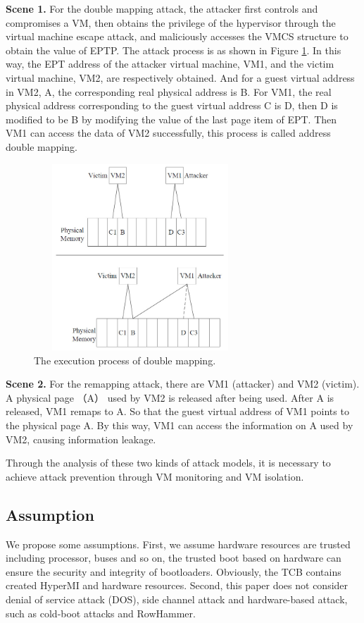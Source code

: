 \documentclass[conference]{IEEEtran}
\begin{document}
\textbf{Scene 1.} 
    For the double mapping attack, the attacker first controls and compromises a VM, then obtains the privilege of the hypervisor through the virtual machine escape attack, and maliciously accesses the VMCS structure to obtain the value of EPTP. The attack process is as shown in Figure \ref{fig0}. In this way, the EPT address of the attacker virtual machine, VM1, and the victim virtual machine, VM2, are respectively obtained. And for a guest virtual address in VM2, A, the corresponding real physical address is B. For VM1, the real physical address corresponding to the guest virtual address C is D, then D is modified to be B by modifying the value of the last page item of EPT. Then VM1 can access the data of VM2 successfully, this process is called address double mapping.

\begin{figure}
\centerline{\includegraphics[width=8cm, height=7cm]{VMCS0.jpg}}%
\caption{The execution process of double mapping. } \label{fig0}
\end{figure}

\textbf{Scene 2.}
    For the remapping attack, there are VM1 (attacker) and VM2 (victim). A physical page （A） used by VM2 is released after being used. After A is released, VM1 remaps to A. So that the guest virtual address of VM1 points to the physical page A. By this way, VM1 can access the information on A used by VM2, causing information leakage.

Through the analysis of these two kinds of attack models, it is necessary to achieve attack prevention through VM monitoring and VM isolation.
\subsection{Assumption}

We propose some assumptions.
First, we assume hardware resources are trusted including processor, buses and so on, the trusted boot based on hardware can ensure the security and integrity of bootloaders. Obviously, the TCB contains created HyperMI and hardware resources. Second, this paper does not consider denial of service attack (DOS), side channel attack and hardware-based attack, such as cold-boot attacks and RowHammer.
\end{document}

